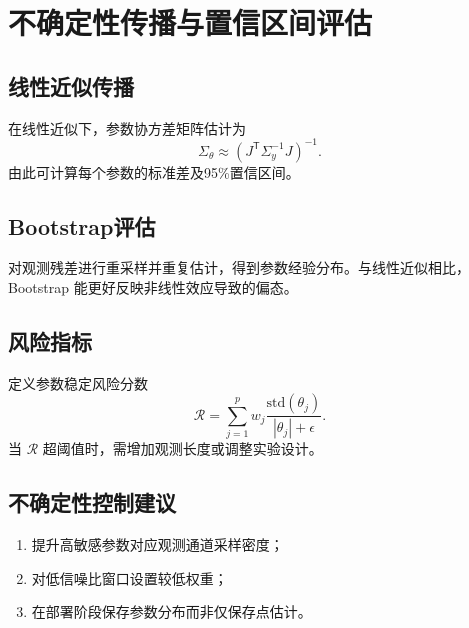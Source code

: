 \chapter{不确定性传播与置信区间评估}

\section{线性近似传播}
在线性近似下，参数协方差矩阵估计为
\[
\Sigma_\theta\approx \left(J^\mathsf{T}\Sigma_y^{-1}J\right)^{-1}.
\]
由此可计算每个参数的标准差及95\%置信区间。

\section{Bootstrap评估}
对观测残差进行重采样并重复估计，得到参数经验分布。与线性近似相比，Bootstrap 能更好反映非线性效应导致的偏态。

\section{风险指标}
定义参数稳定风险分数
\[
\mathcal{R}=\sum_{j=1}^p w_j \frac{\text{std}(\theta_j)}{|\theta_j|+\epsilon}.
\]
当 $\mathcal{R}$ 超阈值时，需增加观测长度或调整实验设计。

\section{不确定性控制建议}
\begin{enumerate}
  \item 提升高敏感参数对应观测通道采样密度；
  \item 对低信噪比窗口设置较低权重；
  \item 在部署阶段保存参数分布而非仅保存点估计。
\end{enumerate}
